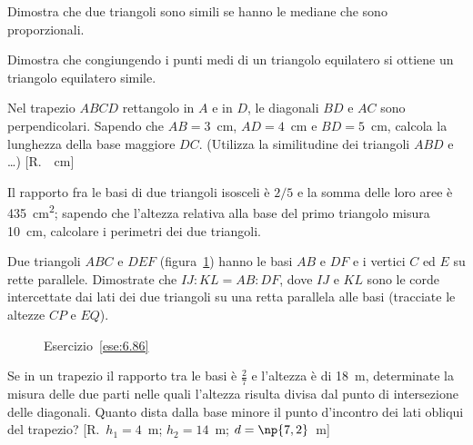 \begin{multicols}{2}
\begin{esercizio}
\label{ese:6.82}
Dimostra che due triangoli sono simili se hanno le mediane che sono proporzionali.
\end{esercizio}

\begin{esercizio}
\label{ese:6.83}
Dimostra che congiungendo i punti medi di un triangolo equilatero si ottiene un triangolo equilatero simile.
\end{esercizio}

\begin{esercizio}
\label{ese:6.84}
Nel trapezio $ABCD$ rettangolo in $A$ e in $D$, le diagonali $BD$ e $AC$ sono perpendicolari. Sapendo che $AB=3$~cm, $AD=4$~cm e $BD=5$~cm, calcola la lunghezza della base maggiore $DC$. (Utilizza la similitudine dei triangoli $ABD$ e \ldots{})	[R.~~cm]
\end{esercizio}

\begin{esercizio}
\label{ese:6.85}
Il rapporto fra le basi di due triangoli isosceli è $2/5$ e la somma delle loro aree è 435~cm\textsuperscript{2}; sapendo che l'altezza relativa alla base del primo triangolo misura 10~cm, calcolare i perimetri dei due triangoli. 
\end{esercizio}

\begin{esercizio}
\label{ese:6.86}
Due triangoli $ABC$ e $DEF$ (figura~\ref{fig:ese6.86}) hanno le basi $AB$ e $DF$ e i vertici $C$ ed $E$ su rette parallele. Dimostrate che $IJ:KL=AB:DF$, dove $IJ$ e $KL$ sono le corde intercettate dai lati dei due triangoli su una retta parallela alle basi (tracciate le altezze $CP$ e $EQ$).
\end{esercizio}

\begin{figure}[!htb]
	\centering
	\caption{Esercizio~\ref{ese:6.86}}\label{fig:ese6.86}
\end{figure}

\begin{esercizio}
\label{ese:6.87}
Se in un trapezio il rapporto tra le basi è $\frac{2}{7}$ e l'altezza è di 18~m, determinate la misura delle due parti nelle quali l'altezza risulta divisa dal punto di intersezione delle diagonali. Quanto dista dalla base minore il punto d'incontro dei lati obliqui del trapezio?  [R.~$h_1=4$~m; $h_2=14$~m; $d=\np{7,2}$~m]
\end{esercizio}


\end{multicols}
